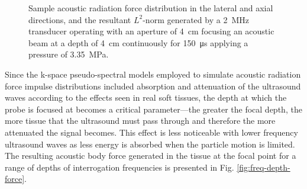 \begin{figure}[!htb]
				\caption[Sample acoustic radiation force distribution]{Sample acoustic radiation force distribution in the \protect{} lateral and \protect{} axial directions, and \protect{} the resultant $L^2$-norm generated by a \SI{2}{\MHz} transducer operating with an aperture of \SI{4}{cm} focusing an acoustic beam at a depth of \SI{4}{\cm} continuously for \SI{150}{\us} applying a pressure of \SI{3.35}{\MPa}.}
				\label{fig:arfi_forces}
			\end{figure}

			Since the k-space pseudo-spectral models employed to simulate acoustic radiation force impulse distributions included absorption and attenuation of the ultrasound waves according to the effects seen in real soft tissues, the depth at which the probe is focused at becomes a critical parameter---the greater the focal depth, the more tissue that the ultrasound must pass through and therefore the more attenuated the signal becomes. This effect is less noticeable with lower frequency ultrasound waves as less energy is absorbed when the particle motion is limited. The resulting acoustic body force generated in the tissue at the focal point for a range of depths of interrogation frequencies is presented in Fig. \ref{fig:freq-depth-force}.

